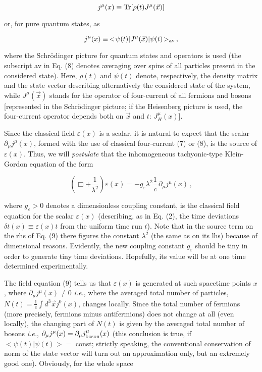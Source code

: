 \documentclass[a4paper,12pt]{article}
\begin{document}
\begin{equation}
j^\mu (x) \equiv {\rm Tr}[\rho(t) J^\mu(\vec{x})]
\end{equation}

\ni or, for pure quantum states, as

\begin{equation}
j^\mu (x) \equiv \,<\!\psi(t) | J^\mu(\vec{x}) | \psi(t)\!>_{\rm av}\,,
\end{equation}

\ni where the Schr\"{o}dinger picture for quantum states and operators is used (the subscript av in Eq. (8) denotes averaging over spins of all particles present in the considered state). Here, $\rho(t)$ and $\psi(t)$ denote, respectively, the density matrix and the state vector describing alternatively the considered state of the system, while $J^\mu (\vec{x})$ stands for the operator of four-current of all fermions and bosons [represented in the Schr\"{o}dinger picture; if the Heisenberg picture is used, the four-current operator depends both on $\vec{x}$ and $t$: $J^\mu_H(x)$].

Since the classical field $\varepsilon(x)$ is a scalar, it is natural to expect that the scalar $\partial_\mu j^\mu (x)$, formed with the use of classical four-current (7) or (8), is the source of $\varepsilon(x)$. Thus, we will {\it postulate} that the inhomogeneous tachyonic-type Klein-Gordon equation of the form

\begin{equation}
\left( \Box + \frac{1}{\lambda^2}\right) \varepsilon (x) = -g_\varepsilon \lambda ^2 \frac{1}{c} \, \partial_\mu j^\mu (x) \,,
\end{equation}

\ni where $g_\varepsilon > 0 $ denotes a dimensionless coupling constant, is the classical field equation for the scalar $\varepsilon(x)$ (describing, as in Eq. (2), the time deviations $\delta t(x) \equiv \varepsilon (x) t$ from the uniform time run $t$). Note that in the source term on the rhs of Eq. (9) there figures  the constant $\lambda^2$ (the same as on its lhs) because of dimensional reasons. Evidently, the new coupling constant $g_\varepsilon $ should be tiny in order to generate tiny time deviations. Hopefully, its value will be at one time determined experimentally.

The field equation (9) tells us that $\varepsilon(x)$ is generated at such spacetime points $x$, where
$\partial_\mu j^\mu (x) \neq 0$ {\it i.e.}, where the averaged total number of particles, $N(t) = \frac{1}{c} \int d^3\vec{x} j^0(x) $, changes locally. Since the total number of fermions (more precisely, fermions minus antifermions) does not change at all (even locally), the changing part of $N(t)$ is given by the averaged total number of bosons {\it i.e.}, $\partial_\mu j^\mu (x) = \partial_\mu j_{\rm boson}^\mu (x)$ (this conclusion is true, if $<\!\psi(t)|\psi(t)\!> =$ const; strictly speaking, the conventional conservation of norm of the state vector will turn out an approximation only, but an extremely good one). Obviously, for the whole space
\end{document}
